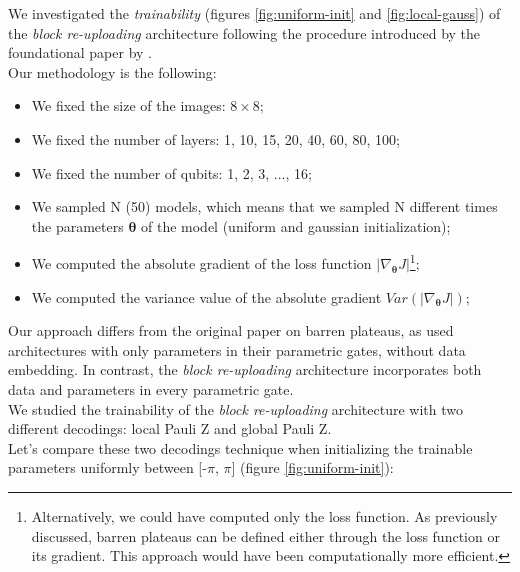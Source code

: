 
We investigated the \textit{trainability} (figures \ref{fig:uniform-init} and \ref{fig:local-gauss}) 
of the \textit{block re-uploading} architecture following the procedure introduced by 
the foundational paper by \cite{McClean_2018}.\\
Our methodology is the following:

\begin{itemize}
    \item We fixed the size of the images: $8\times8$;
    \item We fixed the number of layers: 1, 10, 15, 20, 40, 60, 80, 100;
    \item We fixed the number of qubits: 1, 2, 3, ..., 16;
    \item We sampled N (50) models, which means that we sampled N different times the parameters 
    $\bm{\theta}$ of the model (uniform and gaussian initialization);
    \item We computed the absolute gradient of the loss function $|\nabla_{\bm{\theta}}J|$\footnote[1]{
        Alternatively, we could have computed only the loss function. As previously discussed, 
        barren plateaus can be defined either through the loss function or its gradient. 
        This approach would have been computationally more efficient.
    };
    \item We computed the variance value of the absolute gradient $Var(|\nabla_{\bm{\theta}}J|)$;
\end{itemize}

Our approach differs from the original paper on barren plateaus, as \cite{McClean_2018} 
used architectures with only parameters in their parametric gates, without data embedding. 
In contrast, the \textit{block re-uploading} architecture incorporates both data and parameters 
in every parametric gate.\\

We studied the trainability of the \textit{block re-uploading} architecture with two different decodings:
local Pauli Z and global Pauli Z.\\ 
Let's compare these two decodings technique when initializing the trainable parameters uniformly 
between [-$\pi$, $\pi$] (figure \ref{fig:uniform-init}):

